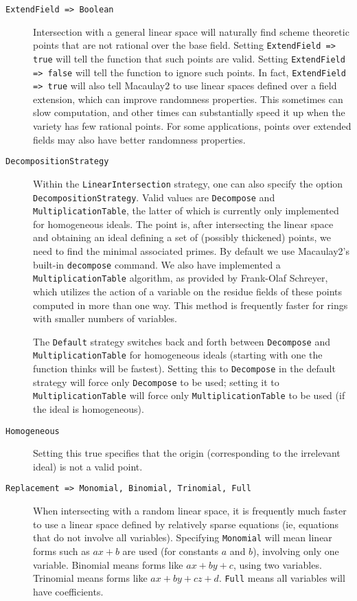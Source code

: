 \documentclass[11pt]{amsart}
\theoremstyle{definition}
\begin{document}
\begin{description}
    \item[\tt ExtendField => Boolean] 

    Intersection with a general linear space will naturally find scheme theoretic points that are not rational over the base field.  
    Setting {\tt ExtendField => true} will tell the function that such points are valid.  Setting {\tt ExtendField => false} will tell the function to ignore such points.  
    In fact, {\tt ExtendField => true} will also tell Macaulay2 to use linear spaces defined over a field extension, which can improve randomness properties.
    This sometimes can slow computation, and other times can substantially speed it up when the variety has few rational points.  For some applications, points over extended fields may also have better randomness properties.

    \item[\tt DecompositionStrategy]  Within the {\tt LinearIntersection} strategy, one can also specify the option {\tt DecompositionStrategy}.  Valid values are {\tt Decompose} and {\tt MultiplicationTable}, the latter of which is currently only implemented for homogeneous ideals.  The point is, after intersecting the linear space and obtaining an ideal defining a set of (possibly thickened) points, we need to find the minimal associated primes.  By default we use Macaulay2's built-in {\tt decompose} command.  We also have implemented a {\tt MultiplicationTable} algorithm, as provided by Frank-Olaf Schreyer, which utilizes the action of a variable on the residue fields of these points computed in more than one way.  This method is frequently faster for rings with smaller numbers of variables.
    
    The {\tt Default} strategy switches back and forth between {\tt Decompose} and {\tt MultiplicationTable} for homogeneous ideals (starting with one the function thinks will be fastest).  Setting this to {\tt Decompose} in the default strategy will force only {\tt Decompose} to be used; setting it to {\tt MultiplicationTable} will force only {\tt MultiplicationTable} to be used (if the ideal is homogeneous).      

    \item[\tt Homogeneous]  Setting this true specifies that the origin (corresponding to the irrelevant ideal) is not a valid point.

    \item[\tt Replacement => Monomial, Binomial, Trinomial, Full]
        When intersecting with a random linear space, it is frequently much faster to use a linear space defined by relatively sparse equations (ie, equations that do not involve all variables).   Specifying {\tt Monomial} will mean linear forms such as $ax + b$ are used (for constants $a$ and $b$), involving only one variable.  Binomial means forms like $ax + by + c$, using two variables.  Trinomial means forms like $ax + by + cz + d$.  {\tt Full} means all variables will have coefficients.  %


\end{description}
\end{document}
